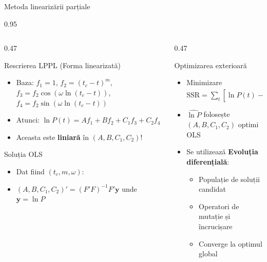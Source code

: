 \documentclass[9pt, aspectratio=169, t]{beamer}
\begin{document}
\begin{frame}{Metoda linearizării parțiale}
    \begin{cminipage}{0.95\textwidth}
    {\scriptsize
    \begin{columns}[T]
        \begin{column}{0.47\textwidth}
            \begin{block}{Rescrierea LPPL (Forma linearizată)}
                \begin{itemize}\setlength{\itemsep}{1pt}
                    \item Baza: $f_1 = 1$, $f_2 = (t_c - t)^m$, $f_3 = f_2\cos(\omega\ln(t_c-t))$, $f_4 = f_2\sin(\omega\ln(t_c-t))$
                    \item Atunci: $\ln P(t) = Af_1 + Bf_2 + C_1 f_3 + C_2 f_4$
                    \item Aceasta este \textbf{liniară} în $(A, B, C_1, C_2)$!
                \end{itemize}
            \end{block}

            \begin{exampleblock}{Soluția OLS}
                \begin{itemize}\setlength{\itemsep}{0pt}
                    \item Dat fiind $(t_c, m, \omega)$:
                    \item $(A, B, C_1, C_2)' = (F'F)^{-1}F'\mathbf{y}$ unde $\mathbf{y} = \ln P$
                \end{itemize}
            \end{exampleblock}
        \end{column}
        \begin{column}{0.47\textwidth}
            \begin{alertblock}{Optimizarea exterioară}
                \begin{itemize}\setlength{\itemsep}{0pt}
                    \item Minimizare $\text{SSR} = \sum_t [\ln P(t) - \widehat{\ln P}(t)]^2$
                    \item $\widehat{\ln P}$ folosește $(A, B, C_1, C_2)$ optimi OLS
                    \item Se utilizează \textbf{Evoluția diferențială}:
                    \begin{itemize}\setlength{\itemsep}{0pt}
                        \item Populație de soluții candidat
                        \item Operatori de mutație și încrucișare
                        \item Converge la optimul global
                    \end{itemize}
                \end{itemize}
            \end{alertblock}


\end{column}
\end{columns}}
\end{cminipage}
\end{frame}
\end{document}
